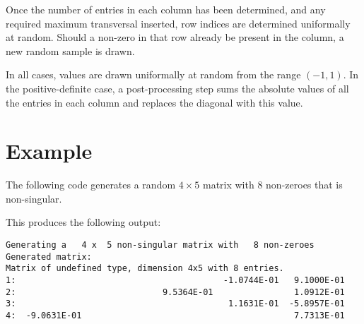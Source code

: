 Once the number of entries in each column has been determined, and any required
maximum transversal inserted, row indices are determined uniformally at random.
Should a non-zero in that row already be present in the column, a new random
sample is drawn.

In all cases, values are drawn uniformally at random from the range $(-1,1)$. In
the positive-definite case, a post-processing step sums the absolute values of
all the entries in each column and replaces the diagonal with this value.


\section{Example} \label{examples}

The following code generates a random $4 \times 5$ matrix with $8$ non-zeroes
that is non-singular.

This produces the following output:
\begin{verbatim}
Generating a   4 x  5 non-singular matrix with   8 non-zeroes
Generated matrix:
Matrix of undefined type, dimension 4x5 with 8 entries.
1:                                         -1.0744E-01   9.1000E-01
2:                             9.5364E-01                1.0912E-01
3:                                          1.1631E-01  -5.8957E-01
4:  -9.0631E-01                                          7.7313E-01
\end{verbatim}

\begin{funders}
\end{funders}
